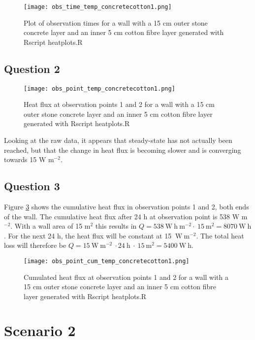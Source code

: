 \documentclass[
10pt, %
a4paper, %
oneside, %
headinclude,footinclude, %
BCOR5mm, %
]{scrartcl}
\begin{document}
\begin{figure}[!h]
\centering
\texttt{[image: obs\_time\_temp\_concretecotton1.png]}
\caption{\label{plot1}Plot of observation times for a wall with a 15 cm outer stone concrete layer and an inner 5 cm cotton fibre layer  generated with Rscript heatplots.R}
\end{figure}

\subsection*{Question 2}

\begin{figure}[!h]
\centering
\texttt{[image: obs\_point\_temp\_concretecotton1.png]}
\caption{\label{plot2} Heat flux at observation points 1 and 2 for a wall with a 15 cm outer stone concrete layer and an inner 5 cm cotton fibre layer generated with Rscript heatplots.R}
\end{figure}

Looking at the raw data, it appears that steady-state has not actually been reached, but that the change in heat flux is becoming slower and is converging towards 15 W m$^{-2}$. 

\newpage
\subsection*{Question 3}

Figure \ref{plot3} shows the cumulative heat flux in observation points 1 and 2, both ends of the wall. The cumulative heat flux after 24 h at observation point is 538 W m$^{-2}$. With a wall area of 15 m$^2$ this results in $Q = 538~\mathrm{W~h~m^{-2}}\cdot~15~\mathrm{m^{2}}= 8070 ~\mathrm{W~h}$. 
For the next 24 h, the heat flux will be constant at 15 $\mathrm{~W~m^{-2}}$. The total heat loss will therefore be $Q=15 \mathrm{~W~m^{-2}}~\cdot 24~\mathrm{h}~\cdot~15~\mathrm{m^{2}}=5400 \mathrm{~W~h}$.

\begin{figure}[!h]
\centering
\texttt{[image: obs\_point\_cum\_temp\_concretecotton1.png]}
\caption{\label{plot3} Cumulated heat flux at observation points 1 and 2 for a wall with a 15 cm outer stone concrete layer and an inner 5 cm cotton fibre layer generated with Rscript heatplots.R}
\end{figure}

\newpage

\section*{Scenario 2}
\end{document}
